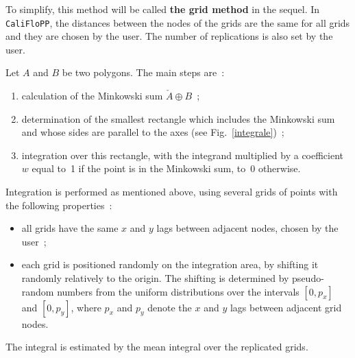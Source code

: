 To simplify, this method will be called \textbf{the grid method} in the
sequel. In \verb+CaliFloPP+, the distances between the nodes of the grids are the same
for all grids and they are chosen by the user. The number of
replications is also set by the user.

\label{grille}
Let $A$ and $B$ be two polygons. The main steps are~:
\begin{enumerate}
\item
calculation of the Minkowski sum $\check{A}\oplus B$~;
\item
determination of the smallest rectangle which includes the Minkowski sum
and whose sides are parallel to the axes (see Fig.~\ref{integrale})~;
\item
integration over this rectangle, with the integrand multiplied by a coefficient 
$w$ equal to~1 if the point is in the Minkowski sum, to~0 otherwise.
\end{enumerate}

Integration is performed as mentioned above, using several grids of
points with the following properties~:
\begin{itemize}
\item all grids have the same $x$ and $y$ lags between adjacent nodes, chosen
  by the user~;
\item each grid is positioned randomly on the integration area, by
  shifting it randomly relatively to the origin. The shifting is
  determined by pseudo-random numbers from the uniform distributions
  over the intervals $[0, p_x]$ and $[0, p_y]$, where $p_x$ and $p_y$
  denote the $x$ and $y$ lags between adjacent grid nodes.
\end{itemize}
The integral is estimated by the mean integral over the replicated grids.

